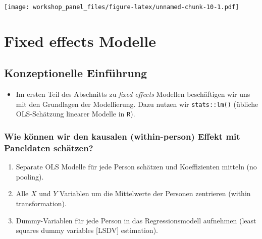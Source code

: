 \documentclass[
]{book}
\providecommand{\tightlist}{%
  \setlength{\itemsep}{0pt}\setlength{\parskip}{0pt}}
\begin{document}
\texttt{[image: workshop\_panel\_files/figure-latex/unnamed-chunk-10-1.pdf]}

\hypertarget{fixed-effects-modelle}{%
\chapter{Fixed effects Modelle}\label{fixed-effects-modelle}}

\hypertarget{konzeptionelle-einfuxfchrung}{%
\section{Konzeptionelle Einführung}\label{konzeptionelle-einfuxfchrung}}

\begin{itemize}
\tightlist
\item
  Im ersten Teil des Abschnitts zu \emph{fixed effects} Modellen beschäftigen wir uns mit den Grundlagen der Modellierung. Dazu nutzen wir \texttt{stats::lm()} (übliche OLS-Schätzung linearer Modelle in \texttt{R}).
\end{itemize}

\hypertarget{wie-kuxf6nnen-wir-den-kausalen-within-person-effekt-mit-paneldaten-schuxe4tzen}{%
\subsection*{Wie können wir den kausalen (within-person) Effekt mit Paneldaten schätzen?}\label{wie-kuxf6nnen-wir-den-kausalen-within-person-effekt-mit-paneldaten-schuxe4tzen}}

\begin{enumerate}
\def\labelenumi{\arabic{enumi})}
\tightlist
\item
  Separate OLS Modelle für jede Person schätzen und Koeffizienten mitteln (no pooling).
\item
  Alle \(X\) und \(Y\) Variablen um die Mittelwerte der Personen zentrieren (within transformation).
\item
  Dummy-Variablen für jede Person in das Regressionsmodell aufnehmen (least squares dummy variables {[}LSDV{]} estimation).
\end{enumerate}
\end{document}
